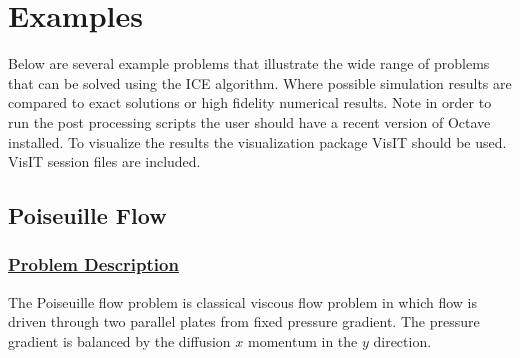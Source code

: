 \newpage
\section{Examples}
Below are several example problems that illustrate the wide range of problems
that can be solved using the ICE algorithm.  Where possible simulation
results are compared to exact solutions or high fidelity numerical results.
Note in order to run the post processing scripts the user should have a
recent version of Octave installed.  To visualize the results the visualization
package VisIT should be used.  VisIT session files are included.
%
\subsection*{\center Poiseuille Flow}
%
%
\subsubsection*{\underline{Problem Description}}
%
The Poiseuille flow problem is classical viscous flow problem in which flow is
driven through two parallel plates from fixed pressure gradient.  The pressure
gradient is balanced by the diffusion $x$ momentum in the $y$ direction.
%
